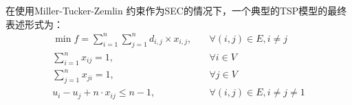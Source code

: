 \begin{example}
  在使用Miller-Tucker-Zemlin 约束作为SEC的情况下，一个典型的TSP模型的最终表述形式为：
  \begin{equation}
    \begin{array}{ll}
        \displaystyle \min f = \sum_{i=1}^n \sum_{j=1}^n d_{i, j} \times x_{i, j}, &\quad \forall (i, j) \in E, i \ne j \\
        \displaystyle \sum_{i = 1}^n x_{ij} = 1, &\quad \forall i \in V \\
        \displaystyle \sum_{j = 1}^n x_{ji} = 1, &\quad \forall j \in V \\
        \displaystyle u_i - u_j + n \cdot x_{ij} \leq n - 1, &\quad \forall (i, j) \in E, i \ne j \ne 1
        \end{array}
  \end{equation}
\end{example}